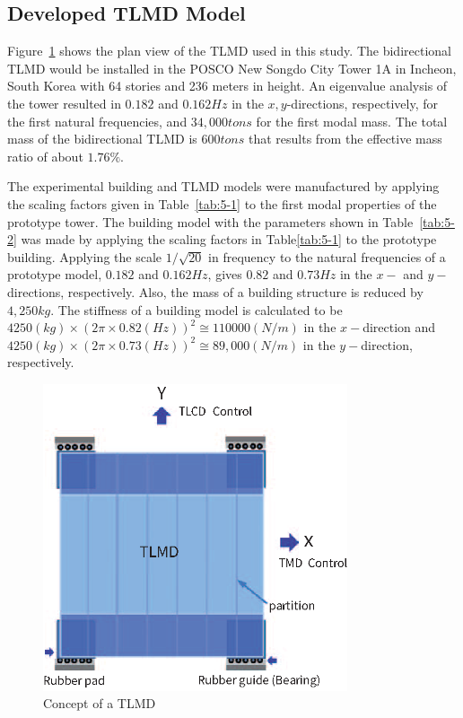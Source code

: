 \subsection{Developed TLMD Model}
Figure~\ref{fig:5-1} shows the plan view of the TLMD used in this study. The bidirectional TLMD would be installed in the POSCO New Songdo City Tower 1A in Incheon, South Korea with 64 stories and 236 meters in height. An eigenvalue analysis of the tower resulted in $0.182$ and $0.162Hz$ in the $x, y$-directions, respectively, for the first natural frequencies, and $34,000tons$ for the first modal mass. The total mass of the bidirectional TLMD is $600tons$ that results from the effective mass ratio of about $1.76\%$.

The experimental building and TLMD models were manufactured by applying the scaling factors given in Table~\ref{tab:5-1} to the first modal properties of the prototype tower. The building model with the parameters shown in Table~\ref{tab:5-2} was made by applying the scaling factors in Table\ref{tab:5-1} to the prototype building. Applying the scale $1/\sqrt{20}$ in frequency to the natural frequencies of a prototype model, $0.182$ and $0.162Hz$, gives $0.82$ and $0.73Hz$ in the $x-$ and $y-$directions, respectively. Also, the mass of a building structure is reduced by $4,250kg$. The stiffness of a building model is calculated to be $4250(kg)\times \left(2\pi \times 0.82(Hz)\right)^{2}\cong 110 000(N/m)$ in the $x-$direction and $4250(kg)\times \left(2\pi \times 0.73(Hz)\right)^{2} \cong 89,000(N/m)$ in the $y-$direction, respectively.

\begin{figure}[ht]
\centering
\includegraphics[width=0.8\textwidth] {figure/5-1.eps}
\caption{Concept of a TLMD}
\label{fig:5-1}
\end{figure}

